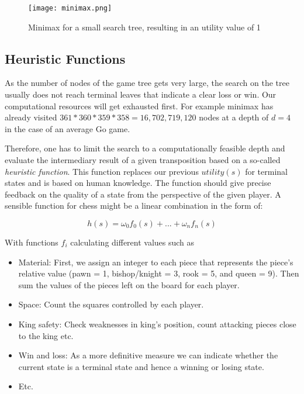 \begin{figure}
    \centering
    \texttt{[image: minimax.png]}
    \caption{Minimax for a small search tree, resulting in an utility value of 1}
    \label{minimax}
\end{figure}

\subsection{Heuristic Functions}
As the number of nodes of the game tree gets very large, the search on the tree usually does not reach terminal leaves that indicate a clear loss or win. Our computational resources will get exhausted first. For example minimax has already visited $ 361 * 360 * 359 * 358 = 16,702,719,120 $ nodes at a depth of $ d = 4 $ in the case of an average Go game.

Therefore, one has to limit the search to a computationally feasible depth and evaluate the intermediary result of a given transposition based on a so-called \textit{heuristic function}. This function replaces our previous $ utility(s) $ for terminal states and is based on human knowledge. The function should give precise feedback on the quality of a state from the perspective of the given player. A sensible function for chess might be a linear combination in the form of:

\begin{equation}
    h(s) = \omega_0f_0(s) + ... + \omega_nf_n(s)
\end{equation}

With functions $ f_i $ calculating different values such as

\begin{itemize}
    \item Material: First, we assign an integer to each piece that represents the piece's relative value (pawn = 1, bishop/knight = 3, rook = 5, and queen = 9). Then sum the values of the pieces left on the board for each player.
    \item Space: Count the squares controlled by each player.
    \item King safety: Check weaknesses in king's position, count attacking pieces close to the king etc.
    \item Win and loss: As a more definitive measure we can indicate whether the current state is a terminal state and hence a winning or losing state.
    \item Etc.
\end{itemize}

